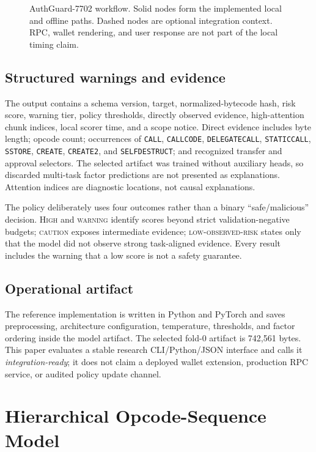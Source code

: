 \documentclass[conference]{IEEEtran}
\newcommand{\system}{AuthGuard-7702}
\newcommand{\code}[1]{\texttt{#1}}
\begin{document}
\begin{figure}[t]
  \centering
  
  \caption{\system{} workflow. Solid nodes form the implemented local and offline paths. Dashed
  nodes are optional integration context. RPC, wallet rendering, and user response are not part
  of the local timing claim.}
  \label{fig:workflow}
\end{figure}

\subsection{Structured warnings and evidence}

The output contains a schema version, target, normalized-bytecode hash, risk score, warning tier,
policy thresholds, directly observed evidence, high-attention chunk indices, local scorer time,
and a scope notice. Direct evidence includes byte length; opcode count; occurrences of
\code{CALL}, \code{CALLCODE}, \code{DELEGATECALL}, \code{STATICCALL}, \code{SSTORE},
\code{CREATE}, \code{CREATE2}, and \code{SELFDESTRUCT}; and recognized transfer and approval
selectors. The selected artifact was trained without auxiliary heads, so discarded multi-task
factor predictions are not presented as explanations. Attention indices are diagnostic locations,
not causal explanations.

The policy deliberately uses four outcomes rather than a binary ``safe/malicious'' decision.
\textsc{High} and \textsc{warning} identify scores beyond strict validation-negative budgets;
\textsc{caution} exposes intermediate evidence; \textsc{low-observed-risk} states only that the
model did not observe strong task-aligned evidence. Every result includes the warning that a low
score is not a safety guarantee.

\subsection{Operational artifact}

The reference implementation is written in Python and PyTorch and saves preprocessing,
architecture configuration, temperature, thresholds, and factor ordering inside the model
artifact. The selected fold-0 artifact is 742,561 bytes. This paper evaluates a stable research
CLI/Python/JSON interface and calls it \emph{integration-ready}; it does not claim a deployed
wallet extension, production RPC service, or audited policy update channel.

\section{Hierarchical Opcode-Sequence Model}
\label{sec:model}
\end{document}
